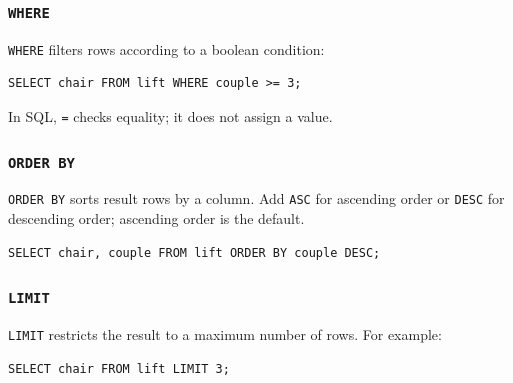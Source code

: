 \subsubsection{\lstinline{WHERE}}
\lstinline{WHERE} filters rows according to a boolean condition:
\begin{lstlisting}
SELECT chair FROM lift WHERE couple >= 3;
\end{lstlisting}
In SQL, \lstinline{=} checks equality; it does not assign a value.

\subsubsection{\lstinline{ORDER BY}}
\lstinline{ORDER BY} sorts result rows by a column. Add \lstinline{ASC} for ascending order or \lstinline{DESC} for descending order; ascending order is the default.
\begin{lstlisting}
SELECT chair, couple FROM lift ORDER BY couple DESC;
\end{lstlisting}

\subsubsection{\lstinline{LIMIT}}
\lstinline{LIMIT} restricts the result to a maximum number of rows. For example:
\begin{lstlisting}
SELECT chair FROM lift LIMIT 3;
\end{lstlisting}

